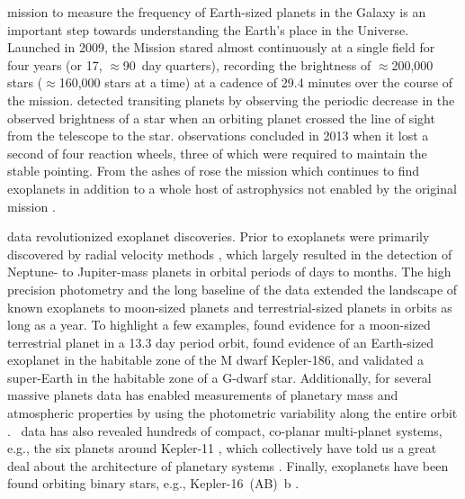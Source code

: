 
 mission to measure the frequency of Earth-sized planets in the Galaxy is an important step towards understanding the Earth's place in the Universe.  Launched in 2009, the \Kepler{} Mission \citep{Koch2010,Borucki2016} stared almost continuously at a single field for four years (or 17, $\approx$90~day quarters), recording the brightness of $\approx$200,000 stars ($\approx$160,000 stars at a time) at a cadence of 29.4 minutes over the course of the mission. \Kepler{} detected transiting planets by observing the periodic decrease in the observed brightness of a star when an orbiting planet crossed the line of sight from the telescope to the star.  observations concluded in 2013 when it lost a second of four reaction wheels, three of which were required to maintain the stable pointing.  From the ashes of \Kepler{} rose the \Ktwo{} mission which continues to find exoplanets in addition to a whole host of astrophysics not enabled by the original \Kepler{} mission \citep{Howell2014,VanCleve2016K2}.


\Kepler{} data revolutionized exoplanet discoveries. Prior to \Kepler{,} exoplanets were primarily discovered by radial velocity methods \citep[e.g.][]{Mayor1995}, which largely resulted in the detection of Neptune- to Jupiter-mass planets in orbital periods of days to months. The high precision photometry and the long baseline of the \Kepler{} data extended the landscape of known exoplanets to moon-sized planets and terrestrial-sized planets in orbits as long as a year. To highlight a few examples, \citet{Barclay2013} found evidence for a moon-sized terrestrial planet in a 13.3 day period orbit, \citet{Quintana2014} found evidence of an Earth-sized exoplanet in the habitable zone of the M dwarf Kepler-186, and \citet{Jenkins2015} validated a super-Earth in the habitable zone of a G-dwarf star. Additionally, for several massive planets \Kepler{} data has enabled measurements of planetary mass and atmospheric properties by using the photometric variability along the entire orbit \citep{Shporer2011,Mazeh2012,Shporer2017}. \Kepler\ data has also revealed hundreds of compact, co-planar multi-planet systems, e.g., the six planets around Kepler-11 \citep{Lissauer2011}, which collectively have told us a great deal about the architecture of planetary systems \citep{Lissauer2011b,Fabrycky2014}.  Finally, exoplanets have been found orbiting binary stars, e.g., Kepler-16~(AB)~b \citep{Doyle2011}.


